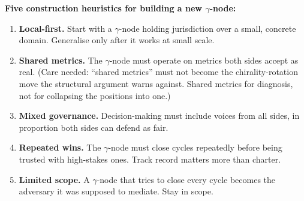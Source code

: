 \documentclass[
]{article}
\begin{document}
\begin{center}
\end{center}

\textbf{Five construction heuristics for building a new
\(\gamma\)-node:}

\begin{enumerate}
\def\labelenumi{\arabic{enumi}.}
\item
  \textbf{Local-first.} Start with a \(\gamma\)-node holding
  jurisdiction over a small, concrete domain. Generalise only after it
  works at small scale.
\item
  \textbf{Shared metrics.} The \(\gamma\)-node must operate on metrics
  both sides accept as real. (Care needed: ``shared metrics'' must
  not become the chirality-rotation move the structural argument
  warns against. Shared metrics for diagnosis, not for collapsing the
  positions into one.)
\item
  \textbf{Mixed governance.} Decision-making must include voices from
  all sides, in proportion both sides can defend as fair.
\item
  \textbf{Repeated wins.} The \(\gamma\)-node must close cycles
  repeatedly before being trusted with high-stakes ones. Track record
  matters more than charter.
\item
  \textbf{Limited scope.} A \(\gamma\)-node that tries to close every
  cycle becomes the adversary it was supposed to mediate. Stay in
  scope.
\end{enumerate}
\end{document}
